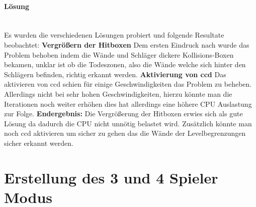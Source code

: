 \paragraph{Lösung}
\mbox{}\\
Es wurden die verschiedenen Lösungen probiert und folgende Resultate beobachtet:
\newline
\textbf{Vergrößern der Hitboxen} 
\newline 
Dem ersten Eindruck nach wurde das Problem behoben indem die Wände und Schläger dickere Kollisions-Boxen bekamen, unklar ist ob die Todeszonen, also die Wände welche sich hinter den Schlägern befinden, richtig erkannt werden.
\newline
\textbf{Aktivierung von ccd} 
\newline 
Das aktivieren von ccd schien für einige Geschwindigkeiten das Problem zu beheben. Allerdings nicht bei sehr hohen Geschwindigkeiten, hierzu könnte man die Iterationen noch weiter erhöhen dies hat allerdings eine höhere CPU Auslastung zur Folge.
\newline
\newline
\textbf{Endergebnis: } Die Vergrößerung der Hitboxen erwies sich als gute Lösung da dadurch die CPU nicht unnötig belastet wird. Zusätzlich könnte man noch ccd aktivieren um sicher zu gehen das die Wände der Levelbegrenzungen sicher erkannt werden.
\newpage
\section{Erstellung des 3 und 4 Spieler Modus}
